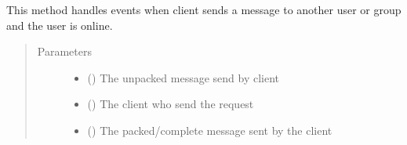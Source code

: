 \documentclass[letterpaper,10pt,english]{sphinxmanual}
\begin{document}
\begin{fulllineitems}
\label{\detokenize{serverHelper:serverHelper.sendMsg}}
This method handles events when client sends a message to another user or group and the user is online.
\begin{quote}\begin{description}
\item[{Parameters}] \leavevmode\begin{itemize}
\item {} 
 () \textendash{} The unpacked message send by client

\item {} 
 () \textendash{} The client who send the request

\item {} 
 () \textendash{} The packed/complete message sent by the client

\end{itemize}

\end{description}\end{quote}

\end{fulllineitems}

\end{document}
